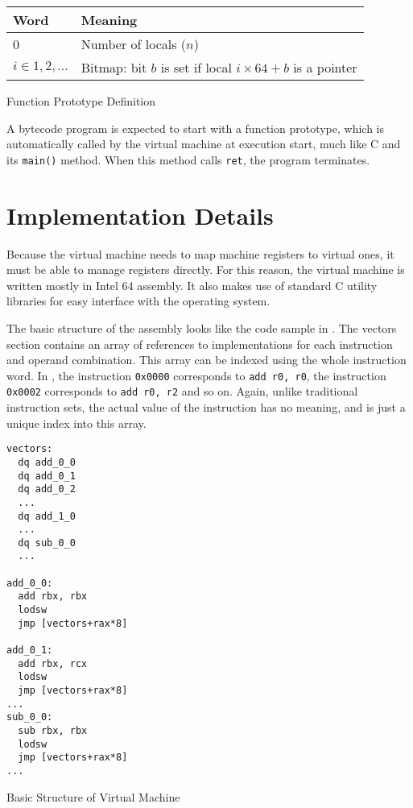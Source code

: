 		\begin{myfigure}
			\begin{tabular}{|l|l| }
				\hline
				Word & Meaning \\
				\hline
				0 & Number of locals ($n$) \\
				\hline
				$i \in 1, 2, ...$ & Bitmap: bit $b$ is set if local $i\times64 + b$ is a pointer \\
				\hline
			\end{tabular}
			\caption{Function Prototype Definition}
			\label{fig:funcproto}
		\end{myfigure}
		
	
		
		A bytecode program is expected to start with a function prototype, which is automatically called by the virtual machine at execution start, much like C and its \texttt{main()} method. When this method calls \texttt{ret}, the program terminates.
		
	\section{Implementation Details}
		Because the virtual machine needs to map machine registers to virtual ones, it must be able to manage registers directly. For this reason, the virtual machine is written mostly in Intel 64 assembly. It also makes use of standard C utility libraries for easy interface with the operating system.
		
		The basic structure of the assembly looks like the code sample in . The vectors section contains an array of references to implementations for each instruction and operand combination. This array can be indexed using the whole instruction word. In , the instruction \texttt{0x0000} corresponds to \texttt{add r0, r0}, the instruction \texttt{0x0002} corresponds to \texttt{add r0, r2} and so on. Again, unlike traditional instruction sets, the actual value of the instruction has no meaning, and is just a unique index into this array.
		
		\begin{myfigure}
			\begin{lstlisting}
vectors:
  dq add_0_0
  dq add_0_1
  dq add_0_2
  ...
  dq add_1_0
  ...
  dq sub_0_0
  ...

add_0_0:
  add rbx, rbx
  lodsw
  jmp [vectors+rax*8]

add_0_1:
  add rbx, rcx
  lodsw
  jmp [vectors+rax*8]
...
sub_0_0:
  sub rbx, rbx
  lodsw
  jmp [vectors+rax*8]
...
			\end{lstlisting}
			\caption{Basic Structure of Virtual Machine}
			\label{fig:vmstructure}
		\end{myfigure}
		
